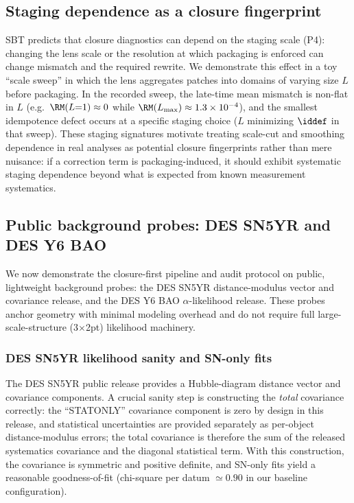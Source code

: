 \documentclass[11pt]{article}
\theoremstyle{definition}
\theoremstyle{plain}
\theoremstyle{remark}
\begin{document}
\subsection{Staging dependence as a closure fingerprint}\label{sec:results:staging}
SBT predicts that closure diagnostics can depend on the staging scale (P4): changing the lens scale or the resolution at which packaging is enforced can change mismatch and the required rewrite.
We demonstrate this effect in a toy ``scale sweep'' in which the lens aggregates patches into domains of varying size $L$ before packaging.
In the recorded sweep, the late-time mean mismatch is non-flat in $L$ (e.g.\ $\RM(L{=}1)\approx 0$ while $\RM(L_{\max})\approx 1.3\times 10^{-4}$), and the smallest idempotence defect occurs at a specific staging choice ($L$ minimizing $\iddef$ in that sweep).
These staging signatures motivate treating scale-cut and smoothing dependence in real analyses as potential closure fingerprints rather than mere nuisance: if a correction term is packaging-induced, it should exhibit systematic staging dependence beyond what is expected from known measurement systematics.

\subsection{Public background probes: DES SN5YR and DES Y6 BAO}\label{sec:results:background}
We now demonstrate the closure-first pipeline and audit protocol on public, lightweight background probes: the DES SN5YR distance-modulus vector and covariance release, and the DES Y6 BAO $\alpha$-likelihood release.
These probes anchor geometry with minimal modeling overhead and do not require full large-scale-structure (3$\times$2pt) likelihood machinery.

\subsubsection{DES SN5YR likelihood sanity and SN-only fits}\label{sec:results:sn5yr}
The DES SN5YR public release provides a Hubble-diagram distance vector and covariance components.
A crucial sanity step is constructing the \emph{total} covariance correctly: the ``STATONLY'' covariance component is zero by design in this release, and statistical uncertainties are provided separately as per-object distance-modulus errors; the total covariance is therefore the sum of the released systematics covariance and the diagonal statistical term.
With this construction, the covariance is symmetric and positive definite, and SN-only fits yield a reasonable goodness-of-fit (chi-square per datum $\simeq 0.90$ in our baseline configuration).
\end{document}
